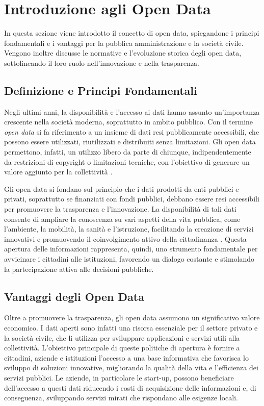 \section{Introduzione agli Open Data}

In questa sezione viene introdotto il concetto di open data, spiegandone i principi fondamentali e i vantaggi per la pubblica amministrazione e la società civile. Vengono inoltre discusse le normative e l'evoluzione storica degli open data, sottolineando il loro ruolo nell’innovazione e nella trasparenza.

\subsection{Definizione e Principi Fondamentali}

Negli ultimi anni, la disponibilità e l’accesso ai dati hanno assunto un'importanza crescente nella società moderna, soprattutto in
ambito pubblico. Con il termine \textit{open data} si fa riferimento a un insieme di dati resi pubblicamente accessibili, che possono essere utilizzati, riutilizzati e distribuiti senza limitazioni. Gli open data permettono, infatti, un utilizzo libero da parte di chiunque, indipendentemente da restrizioni di copyright o limitazioni tecniche, con l’obiettivo di generare un valore aggiunto per la collettività \cite{Smith2018}.

Gli open data si fondano sul principio che i dati prodotti da enti pubblici e privati, soprattutto se finanziati con fondi pubblici, debbano essere resi accessibili per promuovere la trasparenza e l’innovazione. La disponibilità di tali dati consente di ampliare la conoscenza su vari aspetti della vita pubblica, come l’ambiente, la mobilità, la sanità e l’istruzione, facilitando la creazione di servizi innovativi e promuovendo il coinvolgimento attivo della cittadinanza \cite{Davies2019}. Questa apertura delle informazioni rappresenta, quindi, uno strumento fondamentale per avvicinare i cittadini alle istituzioni, favorendo un dialogo costante e stimolando la partecipazione attiva alle decisioni pubbliche.

\subsection{Vantaggi degli Open Data}

Oltre a promuovere la trasparenza, gli open data assumono un significativo valore economico. I dati aperti sono infatti una risorsa essenziale per il settore privato e la società civile, che li utilizza per sviluppare applicazioni e servizi utili alla collettività. L’obiettivo principale di queste politiche di apertura è fornire a cittadini, aziende e istituzioni l'accesso a una base informativa che favorisca lo sviluppo di soluzioni innovative, migliorando la qualità della vita e l’efficienza dei servizi pubblici. Le aziende, in particolare le start-up, possono beneficiare dell'accesso a questi dati riducendo i costi di acquisizione delle informazioni e, di conseguenza, sviluppando servizi mirati che rispondano alle esigenze locali.

